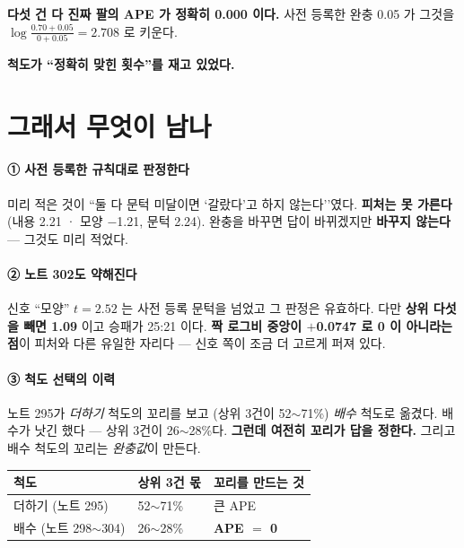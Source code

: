 \documentclass[10pt]{article}
\begin{document}
\textbf{다섯 건 다 진짜 팔의 APE 가 정확히 0.000 이다.} 사전 등록한 완충
0.05 가 그것을 $\log\frac{0.70+0.05}{0+0.05}{=}2.708$ 로 키운다.

\begin{center}\small
\textbf{척도가 ``정확히 맞힌 횟수''를 재고 있었다.}
\end{center}

\section{그래서 무엇이 남나}

\paragraph{① 사전 등록한 규칙대로 판정한다} 미리 적은 것이 ``둘 다 문턱
미달이면 `갈랐다'고 하지 않는다''였다. \textbf{피처는 못 가른다}(내용 2.21 ·
모양 $-$1.21, 문턱 2.24). 완충을 바꾸면 답이 바뀌겠지만 \textbf{바꾸지
않는다} --- 그것도 미리 적었다.

\paragraph{② 노트 302도 약해진다} 신호 ``모양'' $t{=}2.52$ 는 사전 등록 문턱을
넘었고 그 판정은 유효하다. 다만 \textbf{상위 다섯을 빼면 1.09} 이고
승패가 25:21 이다. \textbf{짝 로그비 중앙이 $+$0.0747 로 0 이 아니라는 점}이
피처와 다른 유일한 자리다 --- 신호 쪽이 조금 더 고르게 퍼져 있다.

\paragraph{③ 척도 선택의 이력} 노트 295가 \emph{더하기} 척도의 꼬리를 보고
(상위 3건이 52$\sim$71\%) \emph{배수} 척도로 옮겼다. 배수가 낫긴 했다 ---
상위 3건이 26$\sim$28\%다. \textbf{그런데 여전히 꼬리가 답을 정한다.}
그리고 배수 척도의 꼬리는 \emph{완충값}이 만든다.

\begin{center}\footnotesize
\begin{tabular}{lll}
\hline
척도 & 상위 3건 몫 & 꼬리를 만드는 것 \\
\hline
더하기 (노트 295) & 52$\sim$71\% & 큰 APE \\
배수 (노트 298$\sim$304) & 26$\sim$28\% & \textbf{APE ${=}$ 0} \\
\hline
\end{tabular}
\end{center}
\end{document}
